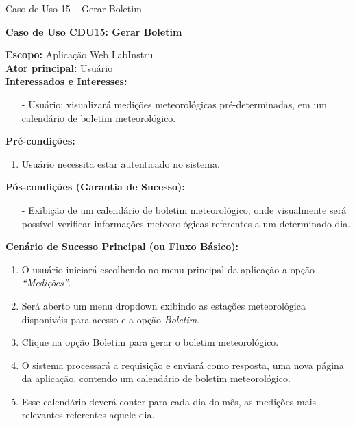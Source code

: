 \begin{quadro}[h!]\caption{Caso de Uso 15 --  Gerar Boletim}
\hfill
\end{quadro}
	\begin{mdframed}

		\textbf{Caso de Uso CDU15: Gerar Boletim}\\

		\begin{flushleft}

		\textbf{Escopo:} Aplicação Web LabInstru\\

		\textbf{Ator principal:} Usuário\\

		\textbf{Interessados e Interesses:}
		\begin{itemize}
			\item[-] Usuário: visualizará medições meteorológicas pré-determinadas, em um calendário de boletim meteorológico.
		\end{itemize}

		\textbf{Pré-condições:}\\
			 \begin{enumerate}
			 	\item{Usuário necessita estar autenticado no sistema.}
			 \end{enumerate}

		\textbf{Pós-condições (Garantia de Sucesso):}
		\begin{itemize}
			\item[-] Exibição de um calendário de boletim meteorológico, onde visualmente será possível verificar informações meteorológicas referentes a um determinado dia.
			\end{itemize}

		\textbf{Cenário de Sucesso Principal (ou Fluxo Básico):}
			\begin{enumerate}
				\item{O usuário iniciará escolhendo no menu principal da aplicação a opção \textit{``Medições''}.}
				\item{Será aberto um menu dropdown exibindo as estações meteorológica disponivéis para acesso e a opção \textit{Boletim}.}
				\item{Clique na opção Boletim para gerar o boletim meteorológico.}
				\item{O sistema processará a requisição e enviará como resposta, uma nova página da aplicação, contendo um calendário de boletim meteorológico.}
				\item{Esse calendário deverá conter para cada dia do mês, as medições mais relevantes referentes aquele dia.}
			 \end{enumerate}


\end{flushleft}
\end{mdframed}
